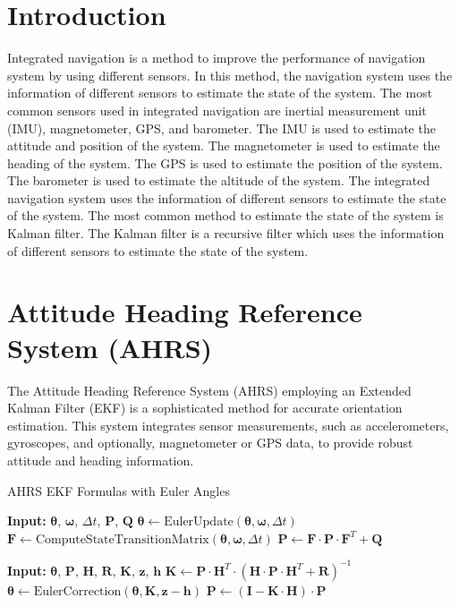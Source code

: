 \documentclass[conference]{IEEEtran}
\begin{document}
\section{Introduction}
    Integrated navigation is a method to improve the performance of navigation system by using different sensors. In this method, the navigation system uses the information of different sensors to estimate the state of the system. The most common sensors used in integrated navigation are inertial measurement unit (IMU), magnetometer, GPS, and barometer. The IMU is used to estimate the attitude and position of the system. The magnetometer is used to estimate the heading of the system. The GPS is used to estimate the position of the system. The barometer is used to estimate the altitude of the system. The integrated navigation system uses the information of different sensors to estimate the state of the system. The most common method to estimate the state of the system is Kalman filter. The Kalman filter is a recursive filter which uses the information of different sensors to estimate the state of the system.



    \section{Attitude Heading Reference System (AHRS)}

    The Attitude Heading Reference System (AHRS) employing an Extended Kalman Filter (EKF) is a sophisticated method for accurate orientation estimation. This system integrates sensor measurements, such as accelerometers, gyroscopes, and optionally, magnetometer or GPS data, to provide robust attitude and heading information.
    \begin{algorithm}
        \caption{AHRS EKF Formulas with Euler Angles}
        \begin{algorithmic}[1]
            \State \textbf{Input:} $\boldsymbol{\theta}$, $\boldsymbol{\omega}$, $\Delta t$, $\mathbf{P}$, $\mathbf{Q}$
            \State $\boldsymbol{\theta} \gets \text{EulerUpdate}(\boldsymbol{\theta}, \boldsymbol{\omega}, \Delta t)$
            \State $\mathbf{F} \gets \text{ComputeStateTransitionMatrix}(\boldsymbol{\theta}, \boldsymbol{\omega}, \Delta t)$
            \State $\mathbf{P} \gets \mathbf{F} \cdot \mathbf{P} \cdot \mathbf{F}^T + \mathbf{Q}$
          \EndProcedure
      
            \State \textbf{Input:} $\boldsymbol{\theta}$, $\mathbf{P}$, $\mathbf{H}$, $\mathbf{R}$, $\mathbf{K}$, $\mathbf{z}$, $\mathbf{h}$
            \State $\mathbf{K} \gets \mathbf{P} \cdot \mathbf{H}^T \cdot (\mathbf{H} \cdot \mathbf{P} \cdot \mathbf{H}^T + \mathbf{R})^{-1}$
            \State $\boldsymbol{\theta} \gets \text{EulerCorrection}(\boldsymbol{\theta}, \mathbf{K}, \mathbf{z} - \mathbf{h})$
            \State $\mathbf{P} \gets (\mathbf{I} - \mathbf{K} \cdot \mathbf{H}) \cdot \mathbf{P}$
          \EndProcedure
        \end{algorithmic}
    \end{algorithm}
          
\end{document}
